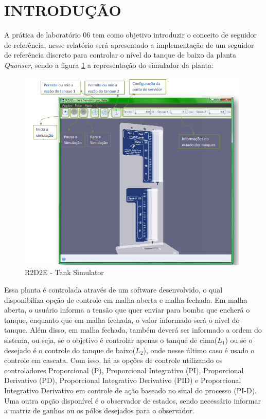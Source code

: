 \documentclass[a4paper,12pt]{article}
\begin{document}
\newpage


\thispagestyle{main}

\section{INTRODUÇÃO}

\hspace{4ex}A prática de laboratório 06 tem como objetivo introduzir o conceito de seguidor de referência, nesse relatório será apresentado a implementação de um seguidor de referência discreto para controlar o nível do tanque de baixo da planta \textit{Quanser}, sendo a figura \ref{r2d2e} a representação do simulador da planta:

\begin{figure}[H]
\centering
\includegraphics[width=11cm]{ImagensLab4/simulator.png}
\caption{R2D2E - Tank Simulator}
\label{r2d2e}
\end{figure}

\hspace{4ex}Essa planta é controlada através de um software desenvolvido, o qual disponibiliza opção de controle em malha aberta e malha fechada. Em malha aberta, o usuário informa a tensão que quer enviar para bomba que encherá o tanque, enquanto que em malha fechada, o valor informado será o nível do tanque. Além disso, em malha fechada, também deverá ser informado a ordem do sistema, ou seja, se o objetivo é controlar apenas o tanque de cima($L_1$) ou se o desejado é o controle do tanque de baixo($L_2$), onde nesse último caso é usado o controle em cascata. Com isso, há as opções de controle utilizando os controladores Proporcional (P), Proporcional Integrativo (PI), Proporcional Derivativo (PD), Proporcional Integrativo Derivativo (PID) e Proporcional Integrativo Derivativo em controle de ação baseado no sinal do processo (PI-D). Uma outra opção disponível é o observador de estados, sendo necessário informar a matriz de ganhos ou os pólos desejados para o observador.
\end{document}
